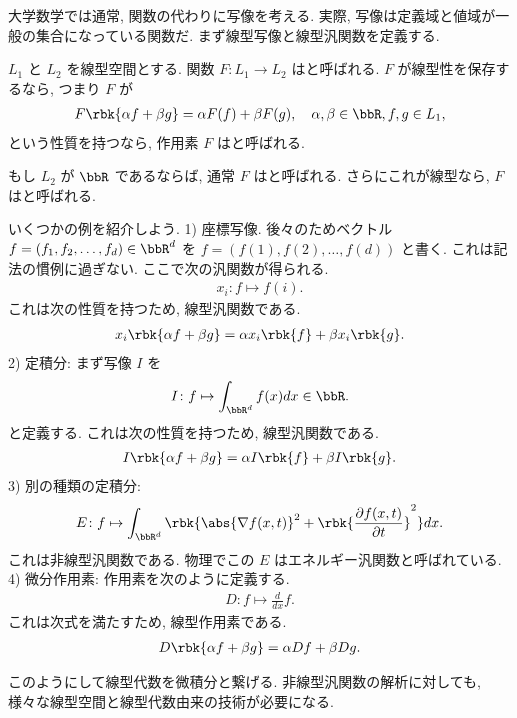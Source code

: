\documentclass[openany, a4paper, oneside]{jsbook}
\begin{document}
大学数学では通常, 関数の代わりに写像を考える.
実際, 写像は定義域と値域が一般の集合になっている関数だ.
まず線型写像と線型汎関数を定義する.
\begin{defn}
 $L_1$ と $L_2$ を線型空間とする.
 関数 $F \colon L_1 \to L_2$ はと呼ばれる.
 $F$ が線型性を保存するなら, つまり $F$ が
 \begin{align}
  F \rbk{\alpha f + \beta g}
  =
  \alpha F(f) + \beta F(g), \quad \alpha, \beta \in \bbR, f, g \in L_1,
 \end{align}
 という性質を持つなら, 作用素 $F$ はと呼ばれる.

 もし $L_2$ が $\bbR$ であるならば, 通常 $F$ はと呼ばれる.
 さらにこれが線型なら, $F$ はと呼ばれる.
\end{defn}
\begin{ex}
いくつかの例を紹介しよう.
1) 座標写像.
 後々のためベクトル $f = (f_1, f_2, \dots, f_d) \in \bbR^d$ を $f = (f(1), f(2), \dots, f(d))$ と書く.
 これは記法の慣例に過ぎない.
 ここで次の汎関数が得られる.
 \begin{align}
  x_i \colon f \mapsto f(i).
 \end{align}
 これは次の性質を持つため, 線型汎関数である.
 \begin{align}
  x_i \rbk{\alpha f + \beta g}
  =
  \alpha x_i \rbk{f} + \beta x_i \rbk{g}.
 \end{align}
2) 定積分: まず写像 $I$ を
 \begin{align}
   I \colon
   f \mapsto \int_{\bbR^d} f(x) dx \in \bbR.
 \end{align}
 と定義する.
 これは次の性質を持つため, 線型汎関数である.
 \begin{align}
  I \rbk{\alpha f + \beta g}
  =
  \alpha I \rbk{f} + \beta I \rbk{g}.
 \end{align}
3) 別の種類の定積分:
 \begin{align}
  E \colon
  f \mapsto \int_{\bbR^d} \rbk{\abs{\nabla f(x, t)}^2 + \rbk{\frac{\partial f(x, t)}{\partial t}}^2} dx. \label{linear-algebra-and-calculus-4}
 \end{align}
 これは非線型汎関数である.
 物理でこの $E$ はエネルギー汎関数と呼ばれている.
4) 微分作用素: 作用素を次のように定義する.
 \begin{align}
  D \colon f \mapsto \frac{d}{dx} f.
 \end{align}
 これは次式を満たすため, \textup{線型作用素}である.
 \begin{align}
  D \rbk{\alpha f + \beta g}
  =
  \alpha Df + \beta Dg.
 \end{align}
\end{ex}
このようにして線型代数を微積分と繋げる.
非線型汎関数の解析に対しても, 様々な線型空間と線型代数由来の技術が必要になる.
\end{document}
